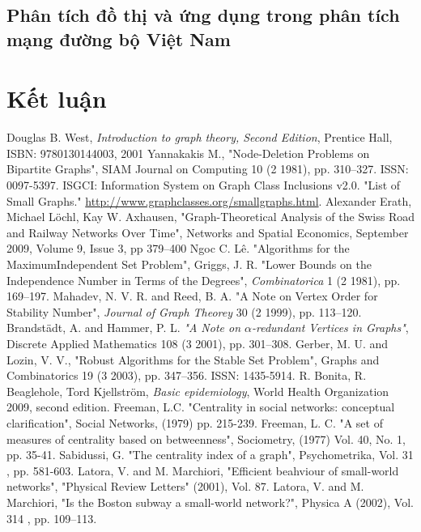 \documentclass[14pt, oneside, a4paper, openany]{scrartcl}
\begin{document}
\subsection{Phân tích đồ thị và ứng dụng trong phân tích mạng đường bộ Việt Nam}
\newpage
\section{Kết luận}

\printindex
\newpage
\begin{thebibliography}{9}
	Douglas B. West,
	\textit{Introduction to graph theory, Second Edition},
	Prentice Hall, ISBN: 9780130144003, 2001
	Yannakakis M.,
	"Node-Deletion Problems on Bipartite Graphs",
	SIAM Journal on Computing 10 (2 1981), pp. 310–327. ISSN: 0097-5397.
	ISGCI: Information System on Graph Class Inclusions v2.0. "List of Small Graphs." \href{http://www.graphclasses.org/smallgraphs.html}{http://www.graphclasses.org/smallgraphs.html}.
	Alexander Erath, Michael Löchl, Kay W. Axhausen,
	"Graph-Theoretical Analysis of the Swiss Road and Railway Networks Over Time", 
	Networks and Spatial Economics,
	September 2009, Volume 9, Issue 3, pp 379–400
	Ngoc C. Lê.
	"Algorithms for the MaximumIndependent Set Problem",
	Griggs, J. R.
	"Lower Bounds on the Independence Number in Terms of the Degrees",
	\textit{Combinatorica} 1 (2 1981), pp. 169–197.
	Mahadev, N. V. R. and Reed, B. A.
	"A Note on Vertex Order for Stability Number",
	\textit{Journal of Graph Theorey} 30 (2 1999), pp. 113–120.
	Brandstädt, A. and Hammer, P. L.
	\textit{"A Note on $\alpha$-redundant Vertices in Graphs"},
	Discrete Applied Mathematics 108 (3 2001), pp. 301–308.
	Gerber, M. U. and Lozin, V. V.,
	"Robust Algorithms for the Stable Set Problem",
	Graphs and Combinatorics 19 (3 2003), pp. 347–356. ISSN: 1435-5914.
	R. Bonita, R. Beaglehole, Tord Kjellström,
	\textit{Basic epidemiology},
	World Health Organization 2009, second edition.
	Freeman, L.C.
	"Centrality in social networks: conceptual clarification",
	Social Networks, (1979) pp. 215-239.
	Freeman, L. C.
	"A set of measures of centrality based on betweenness",
	Sociometry, (1977) Vol. 40, No. 1, pp. 35-41.
	Sabidussi, G. 
	"The centrality index of a graph",
	 Psychometrika, Vol. 31 , pp. 581-603.
	 Latora, V. and M. Marchiori,
	 "Efficient beahviour of small-world networks",
	 "Physical Review Letters" (2001), Vol. 87.
	 Latora, V. and M. Marchiori, 
	 "Is the Boston subway a small-world network?",
	 Physica A (2002), Vol. 314 , pp. 109–113.
\end{thebibliography}
\end{document}

